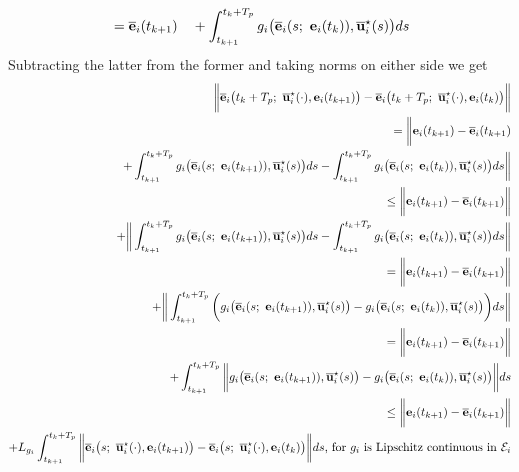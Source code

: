 \begin{gg_box}
\begin{alignat}{2}
    &= \overline{\vect{e}}_i(t_{k+1}) &&+ \int_{t_{k+1}}^{t_k + T_p} g_i\big(\overline{\vect{e}}_i(s;\ \vect{e}_i(t_k)), \overline{\vect{u}}_i^{\star}(s) \big)ds \\
\end{alignat}
Subtracting the latter from the former and taking norms on either side we get
\begin{alignat}{2}
  \bigg \|\overline{\vect{e}}_i\big(t_k + T_p;\ \overline{\vect{u}}_i^{\star}(\cdot), \vect{e}_i(t_{k+1})\big)
    - \overline{\vect{e}}_i\big(t_k + T_p;\ \overline{\vect{u}}_i^{\star}(\cdot), \vect{e}_i(t_k)\big) \bigg\| \\
  = \bigg \| \vect{e}_i(t_{k+1}) - \overline{\vect{e}}_i(t_{k+1}) \\
  + \int_{t_{k+1}}^{t_k + T_p} g_i\big(\overline{\vect{e}}_i(s;\ \vect{e}_i(t_{k+1})), \overline{\vect{u}}_i^{\star}(s) \big)ds
    - \int_{t_{k+1}}^{t_k + T_p} g_i\big(\overline{\vect{e}}_i(s;\ \vect{e}_i(t_k)), \overline{\vect{u}}_i^{\star}(s) \big)ds \bigg \| \\
  \leq \bigg \| \vect{e}_i(t_{k+1}) - \overline{\vect{e}}_i(t_{k+1}) \bigg\| \\
  + \bigg \| \int_{t_{k+1}}^{t_k + T_p} g_i\big(\overline{\vect{e}}_i(s;\ \vect{e}_i(t_{k+1})), \overline{\vect{u}}_i^{\star}(s) \big)ds
    - \int_{t_{k+1}}^{t_k + T_p} g_i\big(\overline{\vect{e}}_i(s;\ \vect{e}_i(t_k)), \overline{\vect{u}}_i^{\star}(s) \big)ds \bigg \| \\
  = \bigg \| \vect{e}_i(t_{k+1}) - \overline{\vect{e}}_i(t_{k+1}) \bigg\| \\
  + \bigg \| \int_{t_{k+1}}^{t_k + T_p} \bigg( g_i\big(\overline{\vect{e}}_i(s;\ \vect{e}_i(t_{k+1})), \overline{\vect{u}}_i^{\star}(s) \big)
  -  g_i\big(\overline{\vect{e}}_i(s;\ \vect{e}_i(t_k)), \overline{\vect{u}}_i^{\star}(s) \big) \bigg) ds \bigg \| \\
  = \bigg \| \vect{e}_i(t_{k+1}) - \overline{\vect{e}}_i(t_{k+1}) \bigg\| \\
  +  \int_{t_{k+1}}^{t_k + T_p} \bigg\| g_i\big(\overline{\vect{e}}_i(s;\ \vect{e}_i(t_{k+1})), \overline{\vect{u}}_i^{\star}(s) \big)
  -  g_i\big(\overline{\vect{e}}_i(s;\ \vect{e}_i(t_k)), \overline{\vect{u}}_i^{\star}(s) \big) \bigg\| ds \\
  \leq \bigg \| \vect{e}_i(t_{k+1}) - \overline{\vect{e}}_i(t_{k+1}) \bigg\| \\
  +  L_{g_i} \int_{t_{k+1}}^{t_k + T_p} \bigg\| \overline{\vect{e}}_i\big(s;\ \overline{\vect{u}}_i^{\star}(\cdot), \vect{e}_i(t_{k+1})\big)
  - \overline{\vect{e}}_i\big(s;\ \overline{\vect{u}}_i^{\star}(\cdot), \vect{e}_i(t_k)\big) \bigg\| ds \text{, for } g_i \text{ is Lipschitz continuous in } \mathcal{E}_i\\

\end{alignat}
\end{gg_box}
